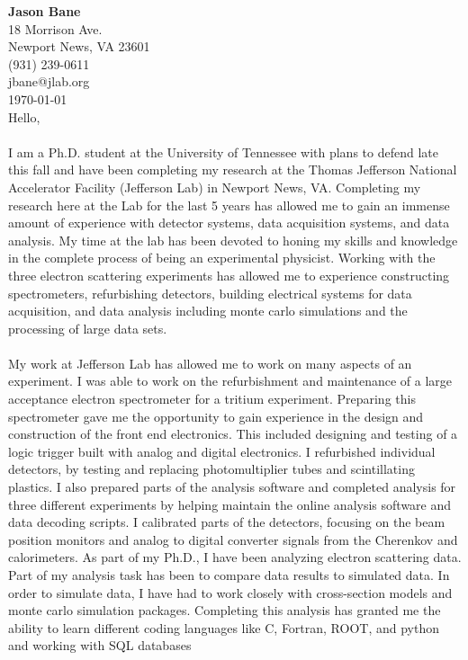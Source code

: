 \documentclass[12pt,letterpaper]{article}
\newcommand{\CPP}
{C\nolinebreak[4]\hspace{-.05em}\raisebox{.22ex}{\footnotesize\bf ++}}
\begin{document}
\vspace*{-1.2cm}
{\textbf{Jason Bane}}\\
18 Morrison Ave. \\
Newport News, VA 23601 \\
(931) 239-0611 \\
jbane@jlab.org \\
\today\\

Hello, 

\paragraph{}I am a Ph.D. student at the University of Tennessee with plans to defend late this fall and have been completing my research at the Thomas Jefferson National Accelerator Facility (Jefferson Lab) in Newport News, VA. Completing my research here at the Lab for the last 5 years has allowed me to gain an immense amount of experience with detector systems, data acquisition systems, and data analysis. My time at the lab has been devoted to honing my skills and knowledge in the complete process of being an experimental physicist. Working with the three electron scattering experiments has allowed me to experience constructing spectrometers, refurbishing detectors, building electrical systems for data acquisition, and data analysis including monte carlo simulations and the processing of large data sets.  
\paragraph{}My work at Jefferson Lab has allowed me to work on many aspects of an experiment. I was able to work on the refurbishment and maintenance of a large acceptance electron spectrometer for a tritium experiment. Preparing this spectrometer gave me the opportunity to gain experience in the design and construction of the front end electronics. This included designing and testing of a logic trigger built with analog and digital electronics. I refurbished individual detectors, by testing and replacing photomultiplier tubes and scintillating plastics.  
I also prepared parts of the analysis software and completed analysis for three different experiments by helping maintain the online analysis software and data decoding scripts. I calibrated parts of the detectors, focusing on the beam position monitors and analog to digital converter signals from the Cherenkov and calorimeters. As part of my Ph.D., I have been analyzing electron scattering data. Part of my analysis task has been to compare data results to simulated data. In order to simulate data, I have had to work closely with cross-section models and monte carlo simulation packages. Completing this analysis has granted me the ability to learn different coding languages like \CPP, Fortran, ROOT, and python and working with SQL databases   
\end{document}

